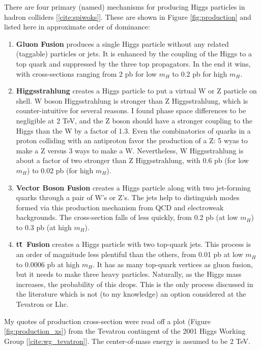 \documentclass[12pt]{article}
\def\lhc{{\sc Lhc}}
\def\ttbar{t\={t}}
\begin{document}
There are four primary (named) mechanisms for producing Higgs
particles in hadron colliders [\ref{cite:spiwoks}]. These are shown in
Figure \ref{fig:production} and listed here in approximate order of
dominance:
\begin{enumerate}

  \item {\bf Gluon Fusion} produces a single Higgs particle without
  any related (taggable) particles or jets. It is enhanced by the
  coupling of the Higgs to a top quark and suppressed by the three top
  propagators. In the end it wins, with cross-sections ranging from 2
  pb for low $m_H$ to 0.2 pb for high $m_H$.

  \item {\bf Higgsstrahlung} creates a Higgs particle to put a
  virtual W or Z particle on shell. W boson Higgsstrahlung is stronger
  than Z Higgsstrahlung, which is counter-intuitive for several
  reasons. I found phase space differences to be negligible at 2 TeV,
  and the Z boson should have a stronger coupling to the Higgs than
  the W by a factor of 1.3. Even the combinatorics of quarks in a
  proton colliding with an antiproton favor the production of a Z: 5
  wyas to make a Z versus 3 ways to make a W. Nevertheless, W
  Higgsstrahlung is about a factor of two stronger than Z
  Higgsstrahlung, with 0.6 pb (for low $m_H$) to 0.02 pb (for high
  $m_H$).

  \item {\bf Vector Boson Fusion} creates a Higgs particle along with
  two jet-forming quarks through a pair of W's or Z's. The jets help
  to distinguish modes formed via this production mechanism from QCD
  and electroweak backgrounds. The cross-section falls of less
  quickly, from 0.2 pb (at low $m_H$) to 0.3 pb (at high $m_H$).

  \item {\bf \ttbar\ Fusion} creates a Higgs particle with two
  top-quark jets. This process is an order of magnitude less plentiful
  than the others, from 0.01 pb at low $m_H$ to 0.0006 pb at high
  $m_H$. It has as many top-quark vertices as gluon fusion, but it
  needs to make three heavy particles. Naturally, as the Higgs mass
  increases, the probability of this drops. This is the only process
  discussed in the literature which is not (to my knowledge) an option
  considered at the Tevatron or \lhc.

\end{enumerate}

My quotes of production cross-section were read off a plot (Figure
\ref{fig:production_xs}) from the Tevatron contingent of the 2001
Higgs Working Group [\ref{cite:wg_tevatron}]. The center-of-mass
energy is assumed to be 2 TeV.
\end{document}
